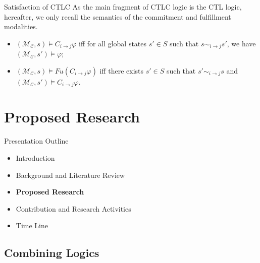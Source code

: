 \documentclass{beamer}
\begin{document}
\begin{frame} {Satisfaction of CTLC}
As the main fragment of CTLC logic is the CTL logic, hereafter, we only recall the semantics of the commitment and fulfillment modalities.
\begin{itemize}
\item $ (\mathcal{M_C}, s ) \models C_{i\rightarrow j} \varphi $ iff for all global states $ s' \in S $ such that $ s \sim_{i \rightarrow j} s' $, we have $ (\mathcal{M_C}, s' ) \models \varphi $;
\item $ (\mathcal{M_C}, s ) \models Fu (C_{i\rightarrow j} \varphi)$ iff there exists $ s' \in S $ such that $ s' \sim_{i \rightarrow j} s $ and $ (\mathcal{M_C}, s' ) \models C_{i\rightarrow j} \varphi$.
\end{itemize}
\end{frame}
\section{Proposed Research}
\begin{frame}{Presentation Outline}
    \begin{itemize}
     	\itemsep=.5cm
    	\item Introduction
    	\item Background and Literature Review
    	\item {\bf Proposed Research}
        \item Contribution and Research Activities
    	\item Time Line
    \end{itemize}
\end{frame}

\subsection{Combining Logics}
\end{document}
